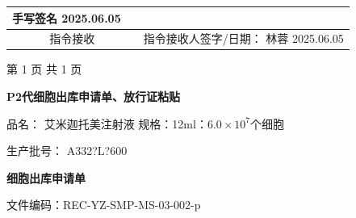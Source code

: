 \documentclass[UTF8,10pt,a4paper,fontset=fandol]{ctexart}
\newcommand{\fieldvalue}[1]{#1}
\newcommand{\handwritten}[1]{#1}
\begin{document}
\begin{tabularx}{\textwidth}{|p{2.2cm}|p{2.7cm}|X|p{2.7cm}|X|}
\fieldvalue{\handwritten{手写签名}}
\quad
\fieldvalue{\handwritten{2025.06.05}}
& \\
\hline
\multicolumn{2}{|c|}{指令接收} &
\multicolumn{3}{l|}{指令接收人签字/日期：
\fieldvalue{\handwritten{林蓉}}
\quad
\fieldvalue{\handwritten{2025.06.05}}} \\
\hline
\end{tabularx}

\begin{center}
第 1 页 共 1 页
\end{center}

\newpage

\begin{center}
\textbf{P2代细胞出库申请单、放行证粘贴}
\end{center}

\noindent
品名：
\fieldvalue{艾米迦托美注射液}
\hfill
规格：12ml：$6.0\times 10^{7}$个细胞

\noindent
生产批号：
\fieldvalue{\handwritten{A332?L?600}}

\vspace{1em}

\begin{center}
\textbf{细胞出库申请单}
\end{center}

\noindent
文件编码：REC-YZ-SMP-MS-03-002-p

\vspace{0.5em}
\end{document}
